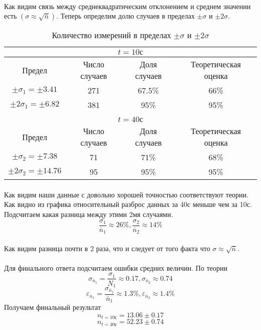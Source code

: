 \documentclass[a4paper, 12pt]{article}
\begin{document}
    \paragraph{}
    Как видим связь между среднеквадратическим отклонением и среднем значении есть $(\sigma \approx \sqrt{\bar{n}})$.
    Теперь определим долю случаев в пределах $\pm\sigma$ и $\pm2\sigma$.

    \begin{table}[H]
    \begin{center}
    \begin{tabular}{|c|c|c|c|}\hline
    \multicolumn{4}{|c|}{$t=10с$}\\\hline
    Предел & Число случаев & Доля случаев & Теоретическая оценка\\\hline
    $\pm \sigma_1 = \pm 3.41$ & 271 & 67.5\% & 66\% \\
    $\pm 2\sigma_1 = \pm 6.82$ & 381 & 95\% & 95\% \\\hline
    \multicolumn{4}{c}{}\\\hline
    \multicolumn{4}{|c|}{$t=40с$}\\\hline
    Предел & Число случаев & Доля случаев & Теоретическая оценка\\\hline
    $\pm \sigma_2 = \pm 7.38$ & 71 & 71\% & 68\% \\
    $\pm 2\sigma_2 = \pm 14.76$ & 95 & 95\% & 95\% \\\hline

    \end{tabular}
    \caption{Количество измерений в пределах $\pm\sigma$ и $\pm2\sigma$}
    \end{center}
    \end{table}

    \paragraph{}
    Как видим наши данные с довольно хорошей точностью соответствуют теории. Как видно из графика относительный разброс данных за 40с меньше чем за 10с. Подсчитаем какая разница между этими 2мя случаями.
    \[\frac{\sigma_1}{\bar{n}_1} \approx 26\%, \frac{\sigma_2}{\bar{n}_2} \approx 14\%\]
    \paragraph{}
    Как видим разница почти в 2 раза, что и следует от того факта что $\sigma \approx \sqrt{\bar{n}}$.
    \paragraph{}
    Для финального ответа подсчитаем ошибки средних величин. По теории
    \[\sigma_{\bar{n}_1} = \frac{\sigma_{1}}{N_1} \approx 0.17, \sigma_{\bar{n}_2} \approx 0.74\]
    \[\varepsilon_{\bar{n}_1} = \frac{\sigma_{\bar{n}_1}}{\bar{n}_1}\approx 1.3\%, \varepsilon_{\bar{n}_2}\approx 1.4\%\]
    Получаем финальный результат
    \[n_{t=10с}=13.06 \pm 0.17\]
    \[n_{t=40с}=52.23 \pm 0.74\]
\end{document}
